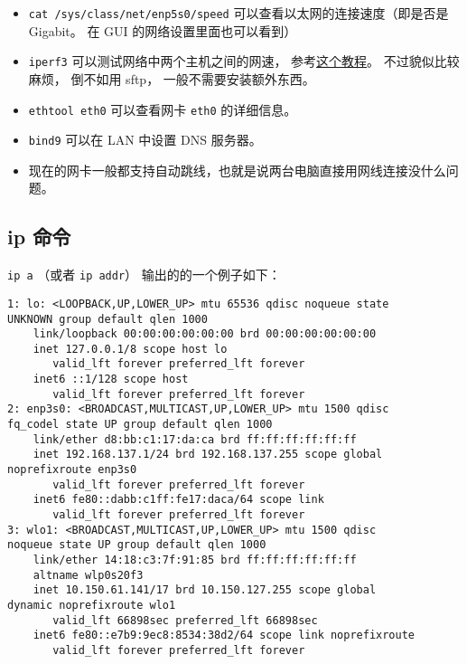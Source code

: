 \begin{itemize}
\item \verb|cat /sys/class/net/enp5s0/speed| 可以查看以太网的连接速度（即是否是 Gigabit。 在 GUI 的网络设置里面也可以看到）
\item \verb|iperf3| 可以测试网络中两个主机之间的网速， 参考\href{https://www.cyberciti.biz/faq/how-to-test-the-network-speedthroughput-between-two-linux-servers/}{这个教程}。 不过貌似比较麻烦， 倒不如用 sftp， 一般不需要安装额外东西。
\item \verb|ethtool eth0| 可以查看网卡 \verb|eth0| 的详细信息。
\item \verb|bind9| 可以在 LAN 中设置 DNS 服务器。
\item 现在的网卡一般都支持自动跳线，也就是说两台电脑直接用网线连接没什么问题。
\end{itemize}

\subsection{ip 命令}
\verb|ip a| （或者 \verb|ip addr|） 输出的的一个例子如下：
\begin{lstlisting}[language=none]
1: lo: <LOOPBACK,UP,LOWER_UP> mtu 65536 qdisc noqueue state 
UNKNOWN group default qlen 1000
    link/loopback 00:00:00:00:00:00 brd 00:00:00:00:00:00
    inet 127.0.0.1/8 scope host lo
       valid_lft forever preferred_lft forever
    inet6 ::1/128 scope host 
       valid_lft forever preferred_lft forever
2: enp3s0: <BROADCAST,MULTICAST,UP,LOWER_UP> mtu 1500 qdisc
fq_codel state UP group default qlen 1000
    link/ether d8:bb:c1:17:da:ca brd ff:ff:ff:ff:ff:ff
    inet 192.168.137.1/24 brd 192.168.137.255 scope global 
noprefixroute enp3s0
       valid_lft forever preferred_lft forever
    inet6 fe80::dabb:c1ff:fe17:daca/64 scope link 
       valid_lft forever preferred_lft forever
3: wlo1: <BROADCAST,MULTICAST,UP,LOWER_UP> mtu 1500 qdisc
noqueue state UP group default qlen 1000
    link/ether 14:18:c3:7f:91:85 brd ff:ff:ff:ff:ff:ff
    altname wlp0s20f3
    inet 10.150.61.141/17 brd 10.150.127.255 scope global 
dynamic noprefixroute wlo1
       valid_lft 66898sec preferred_lft 66898sec
    inet6 fe80::e7b9:9ec8:8534:38d2/64 scope link noprefixroute 
       valid_lft forever preferred_lft forever
\end{lstlisting}
